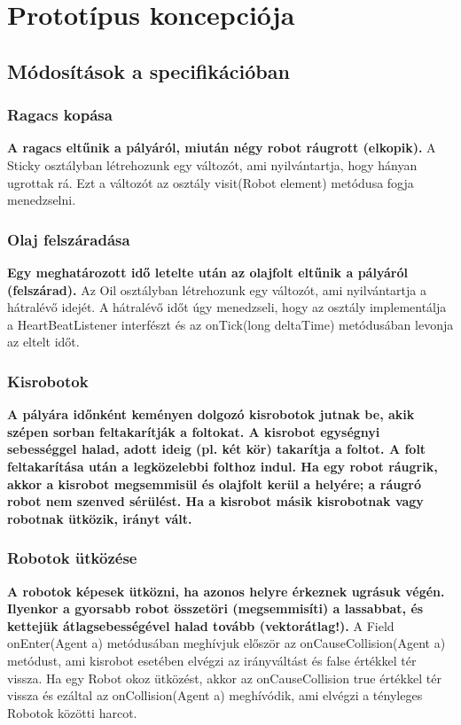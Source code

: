 %
\chapter{Prototípus koncepciója}

\thispagestyle{fancy}

\setcounter{section}{-1}
\section{Módosítások a specifikációban}

\subsection{Ragacs kopása}
\textbf{A ragacs eltűnik a pályáról, miután négy robot ráugrott (elkopik).}\newline
A Sticky osztályban létrehozunk egy változót, ami nyilvántartja, hogy hányan ugrottak rá. Ezt a változót az osztály visit(Robot element) metódusa fogja menedzselni.

\subsection{Olaj felszáradása}
\textbf{Egy meghatározott idő letelte után az olajfolt eltűnik a pályáról (felszárad).}\newline
Az Oil osztályban létrehozunk egy változót, ami nyilvántartja a hátralévő idejét. A hátralévő időt úgy menedzseli, hogy az osztály implementálja a HeartBeatListener interfészt és az onTick(long deltaTime) metódusában levonja az eltelt időt.

\subsection{Kisrobotok}
\textbf{A pályára időnként keményen dolgozó kisrobotok jutnak be, akik szépen sorban feltakarítják a foltokat. A kisrobot egységnyi sebességgel halad, adott ideig (pl. két kör) takarítja a foltot. A folt feltakarítása után a legközelebbi folthoz indul. Ha egy robot ráugrik, akkor a kisrobot megsemmisül és olajfolt kerül a helyére; a ráugró robot nem szenved sérülést. Ha a kisrobot másik kisrobotnak vagy robotnak ütközik, irányt vált.}  \\

\subsection{Robotok ütközése}
\textbf{A robotok képesek ütközni, ha azonos helyre érkeznek ugrásuk végén. Ilyenkor a gyorsabb robot összetöri (megsemmisíti) a lassabbat, és kettejük átlagsebességével halad tovább (vektorátlag!).}\newline
A Field onEnter(Agent a) metódusában meghívjuk először az onCauseCollision(Agent a) metódust, ami kisrobot esetében elvégzi az irányváltást és false értékkel tér vissza. Ha egy Robot okoz ütközést, akkor az onCauseCollision true értékkel tér vissza és ezáltal az onCollision(Agent a) meghívódik, ami elvégzi a tényleges Robotok közötti harcot.


